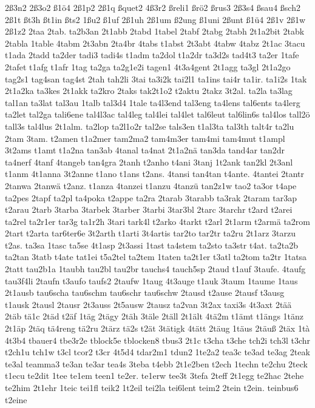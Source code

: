 {2ß3n2
2ß3o2
ß1ö4
2ß1p2
2ß1q
ßquet2
4ß3r2
ßreli1
ßrö2
ßrus3
2ß3s4
ßsau4
ßsch2
2ß1t
ßt3h
ßt1in
ßts2
1ßu2
ß1uf
2ß1uh
2ß1um
ß2ung
ß1uni
2ßunt
ß1ü4
2ß1v
2ß1w
2ß1z2
2taa
2tab.
ta2b3an
2t1abb
2tabd
1tabel
2tabf
2tabg
2tabh
2t1a2bit
2tabk
2tabla
1table
4tabm
2t3abn
2ta4br
4tabs
t1abst
2t3abt
4tabw
4tabz
2t1ac
3tacu
t1ada
2tadd
ta2der
tadi3
tadi4s
t1adm
ta2dol
t1a2dr
ta3d2s
tad4t3
ta2er
1tafe
2tafet
t1afg
t1afr
1tag
ta2ga
ta2g1e2i
tagen1
4t3a4gent
2t1agg
ta3gl
2t1a2go
tag2s1
tag4san
tag4st
2tah
tah2li
3tai
ta3i2k
tai2l1
ta1ins
tai4r
ta1ir.
ta1i2s
1tak
2t1a2ka
ta3kes
2t1akk
ta2kro
2taks
tak2t1o2
t2aktu
2takz
3t2al.
ta2la
ta3lag
tal1an
ta3lat
tal3au
1talb
tal3d4
1tale
ta4l3end
tal3eng
ta4lens
tal6ents
ta4lerg
ta2let
tal2ga
tali6ene
tal4l3ac
tal4leg
tal4lei
tal4let
tal6leut
tal6lin6s
tal4los
tall2ö
tall3s
tal4lus
2t1alm.
ta2lop
ta2l1o2r
tal2se
tals3en
t1al3ta
tal3th
talt4r
ta2lu
2tam
3tam.
t2amen
t1a2mer
tam2ma2
tam4m3er
tam4mi
tam4mut
t1ampl
3t2ams
t1amt
t1a2na
tan3ab
4tanal
ta4nat
2t1a2nä
tan3da
tand4ar
tan2dr
ta4nerf
4tanf
4tangeb
tan4gra
2tanh
t2anho
t4ani
3tanj
1t2ank
tan2kl
2t3anl
t1anm
4t1anna
3t2anne
t1ano
t1ans
t2ans.
4tansi
tan4tan
t4ante.
4tantei
2tantr
2tanwa
2tanwä
t2anz.
t1anza
4tanzei
t1anzu
4tanzü
tan2z1w
tao2
ta3or
t4ape
ta2pes
2tapf
ta2pl
ta4poka
t2appe
ta2ra
2tarab
3tarabb
ta3rak
2taram
tar3ap
t2arau
2tarb
3tarba
3tarbek
3tarber
3tarbi
3tar3bl
2tarc
3tarchr
t2ard
t2arei
ta2rel
ta2r1er
tar3g
ta1r2h
3tari
tark4l
t2arko
4tarkt
t2arl
2t1arm
t2armä
ta2rom
2tart
t2arta
tar6ter6e
3t2arth
t1arti
3t4artis
tar2to
tar2tr
ta2ru
2t1arz
3tarzu
t2as.
ta3sa
1tasc
ta5se
4t1asp
2t3assi
1tast
ta4stem
ta2sto
ta3str
t4at.
ta2ta2b
ta2tan
3tatb
t4ate
tat1ei
t5a2tel
ta2tem
1taten
ta2t1er
t3atl
ta2tom
ta2tr
1tatsa
2tatt
tau2b1a
1taubh
tau2bl
tau2br
tauchs4
tauch5sp
2taud
t1auf
3taufe.
4taufg
tau3f4li
2taufn
t3aufo
taufs2
2taufw
1taug
4t3auge
t1auk
3taum
1taume
1taus
2t1ausb
tau6scha
tau6schm
tau6schr
tau6schw
2tausd
t2ause
2tausf
t3ausg
t1ausk
2tausl
2tausr
2t3auss
2t5ausw
2tausz
ta2van
3t2ax
taxi3s
4t3axt
2tää
2täb
tä1c
2täd
t2äf
1täg
2tägy
2täh
3täle
2täll
2t1ält
4tä2m
t1ämt
t1ängs
1tänz
2t1äp
2täq
tä4reng
tä2ru
2tärz
tä2s
t2ät
3tätigk
4tätt
2täug
1täus
2täuß
2täx
1tà
4t3b4
tbauer4
tbe3r2e
tblock5e
tblocken8
tbus3
2t1c
t3cha
t3che
tch2i
tch3l
t3chr
t2ch1u
tch1w
t3cl
tcor2
t3cr
4t5d4
tdar2m1
tdun2
1te2a2
tea3c
te3ad
te3ag
2teak
te3al
teamma3
te3an
te3ar
tea4s
3teba
t4ebb
2t1e2ben
t2ech
1techn
te2chu
2teck
t1ecu
te2dit
1tee
te1em
teen1
te2er.
te1erw
tee3t
3tefa
2teff
2t1egg
te2hac
2tehe
te2him
2t1ehr
1teic
tei1fl
teik2
1t2eil
tei2la
tei6lent
teim2
2tein
t2ein.
teinbus6
t2eine
}
